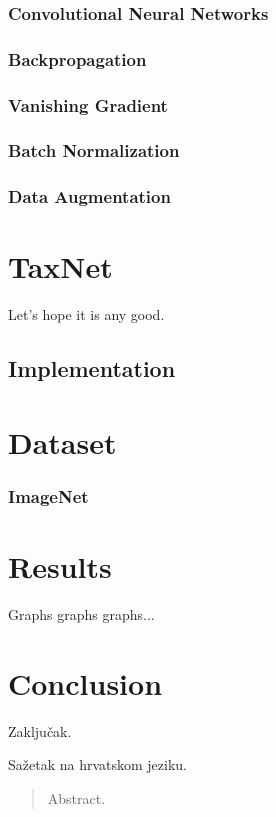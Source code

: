 \documentclass[times, utf8, diplomski]{fer}
\begin{document}
\subsection{Convolutional Neural Networks}
\subsection{Backpropagation}
\subsection{Vanishing Gradient}
\subsection{Batch Normalization}
\subsection{Data Augmentation}


\chapter{TaxNet}
Let's hope it is any good.
\section{Implementation}

\chapter{Dataset}
\subsection{ImageNet}

\chapter{Results}
Graphs graphs graphs...

\chapter{Conclusion}
Zaključak.





\begin{sazetak}
Sažetak na hrvatskom jeziku.

\end{sazetak}

\begin{abstract}
Abstract.

\end{abstract}
\end{document}
